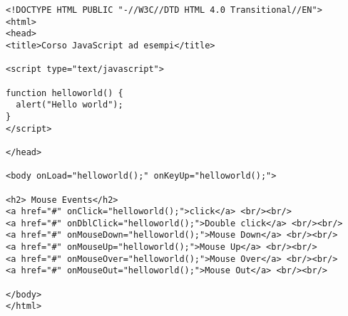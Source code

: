 \begin{verbatim}
<!DOCTYPE HTML PUBLIC "-//W3C//DTD HTML 4.0 Transitional//EN">
<html>
<head>
<title>Corso JavaScript ad esempi</title>

<script type="text/javascript">

function helloworld() {
  alert("Hello world");
}
</script>

</head>

<body onLoad="helloworld();" onKeyUp="helloworld();">

<h2> Mouse Events</h2>
<a href="#" onClick="helloworld();">click</a> <br/><br/>
<a href="#" onDblClick="helloworld();">Double click</a> <br/><br/>
<a href="#" onMouseDown="helloworld();">Mouse Down</a> <br/><br/>
<a href="#" onMouseUp="helloworld();">Mouse Up</a> <br/><br/>
<a href="#" onMouseOver="helloworld();">Mouse Over</a> <br/><br/>
<a href="#" onMouseOut="helloworld();">Mouse Out</a> <br/><br/>

</body>
</html>
\end{verbatim}

